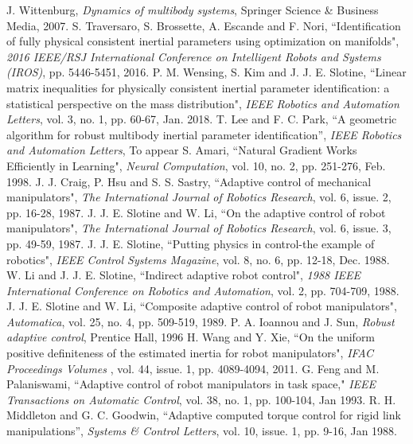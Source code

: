 \documentclass[letterpaper, 10 pt, conference]{ieeeconf}  %
\begin{document}
\begin{thebibliography}{99}
  J. Wittenburg, {\em Dynamics of multibody systems}, Springer Science \& Business Media, 2007.
 S. Traversaro, S. Brossette, A. Escande and F. Nori, ``Identification of fully physical consistent inertial parameters using optimization on manifolds", {\em 2016 IEEE/RSJ International Conference on Intelligent Robots and Systems (IROS)}, pp. 5446-5451, 2016.
 P. M. Wensing, S. Kim and J. J. E. Slotine, ``Linear matrix inequalities for physically consistent inertial parameter identification: a statistical perspective on the mass distribution", {\em IEEE Robotics and Automation Letters}, vol. 3, no. 1, pp. 60-67, Jan. 2018.
 T. Lee and F. C. Park, ``A geometric algorithm for robust multibody inertial parameter identification'', {\em IEEE Robotics and Automation Letters}, To appear
 S. Amari, ``Natural Gradient Works Efficiently in Learning", {\em Neural Computation}, vol. 10, no. 2, pp. 251-276, Feb. 1998.
 J. J. Craig, P. Hsu and S. S. Sastry, ``Adaptive control of mechanical manipulators", {\em The International Journal of Robotics Research}, vol. 6, issue. 2, pp. 16-28, 1987.
 J. J. E. Slotine and W. Li, ``On the adaptive control of robot manipulators", {\em The International Journal of Robotics Research}, vol. 6, issue. 3, pp. 49-59, 1987. 
 J. J. E. Slotine, ``Putting physics in control-the example of robotics", {\em IEEE Control Systems Magazine}, vol. 8, no. 6, pp. 12-18, Dec. 1988.
 W. Li and J. J. E. Slotine, ``Indirect adaptive robot control", {\em  1988 IEEE International Conference on Robotics and Automation}, vol. 2, pp. 704-709, 1988.
 J. J. E. Slotine and W. Li, ``Composite adaptive control of robot manipulators", {\em Automatica}, vol. 25, no. 4, pp. 509-519, 1989.
 P. A. Ioannou and J. Sun, {\em Robust adaptive control}, Prentice Hall, 1996
 H. Wang and Y. Xie, ``On the uniform positive definiteness of the estimated inertia for robot manipulators", {\em IFAC Proceedings Volumes }, vol. 44, issue. 1, pp. 4089-4094, 2011.
 G. Feng and M. Palaniswami, ``Adaptive control of robot manipulators in task space," {\em IEEE Transactions on Automatic Control}, vol. 38, no. 1, pp. 100-104, Jan 1993.
 R. H. Middleton and G. C. Goodwin, ``Adaptive computed torque control for rigid link manipulations'', {\em Systems \& Control Letters}, vol. 10, issue. 1, pp. 9-16, Jan 1988.

\end{thebibliography}
\end{document}
